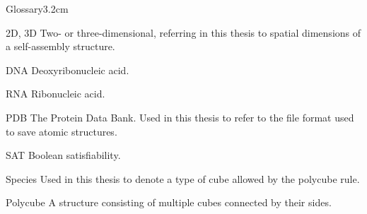 \begin{mclistof}{Glossary}{3.2cm}

\item[2D, 3D] Two- or three-dimensional, referring in this thesis to spatial dimensions of a self-assembly structure.
\item[DNA] Deoxyribonucleic acid.
\item[RNA] Ribonucleic acid.
\item[PDB] The Protein Data Bank. Used in this thesis to refer to the file format used to save atomic structures.
\item[SAT] Boolean satisfiability.
\item[Species] Used in this thesis to denote a type of cube allowed by the polycube rule.
\item[Polycube] A structure consisting of multiple cubes connected by their sides.

\end{mclistof} 
